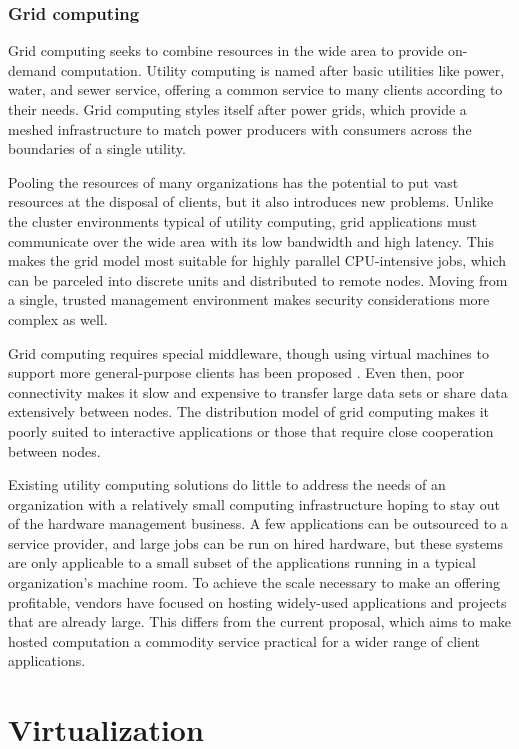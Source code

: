 \subsubsection{Grid computing}

Grid computing \cite{foster} seeks to combine resources in the wide area to provide on-demand computation. Utility computing is named after basic utilities like power, water, and sewer service, offering a common service to many clients according to their needs. Grid computing styles itself after power grids, which provide a meshed infrastructure to match power producers with consumers across the boundaries of a single utility.

Pooling the resources of many organizations has the potential to put vast resources at the disposal of clients, but it also introduces new problems. Unlike the cluster environments typical of utility computing, grid applications must communicate over the wide area with its low bandwidth and high latency. This makes the grid model most suitable for highly parallel CPU-intensive jobs, which can be parceled into discrete units and distributed to remote nodes. Moving from a single, trusted management environment makes security considerations more complex as well.

Grid computing requires special middleware, though using virtual machines to support more general-purpose clients has been proposed \cite{figueiredo03,zhao04}. Even then, poor connectivity makes it slow and expensive to transfer large data sets or share data extensively between nodes. The distribution model of grid computing makes it poorly suited to interactive applications or those that require close cooperation between nodes.

Existing utility computing solutions do little to address the needs of an organization with a relatively small computing infrastructure hoping to stay out of the hardware management business. A few applications can be outsourced to a service provider, and large jobs can be run on hired hardware, but these systems are only applicable to a small subset of the applications running in a typical organization's machine room. To achieve the scale necessary to make an offering profitable, vendors have focused on hosting widely-used applications and projects that are already large. This differs from the current proposal, which aims to make hosted computation a commodity service practical for a wider range of client applications.

\section{Virtualization}

